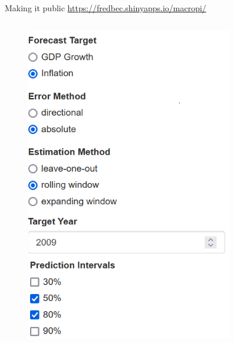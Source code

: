 \documentclass[en]{sdqbeamer}
\begin{document}
\begin{frame}{Making it public}
\url{https://fredbec.shinyapps.io/macropi/}
\begin{columns}
\begin{column}{0.2\textwidth}
    \begin{figure}
        \centering
        \includegraphics[width=\textwidth]{figures/shinycap2.png}
        \label{fig:enter-label}
    \end{figure} 
\end{column}
\begin{column}{0.6\textwidth}
    \begin{figure}

\end{figure}
\end{column}
\end{columns}
\end{frame}
\end{document}
